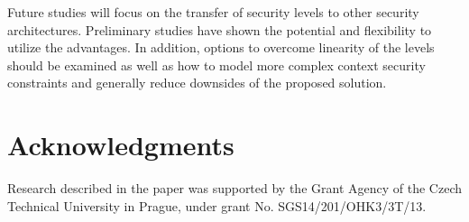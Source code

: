 \documentclass{sig-alternate}
\begin{document}
Future studies will focus on the transfer of security levels to other security architectures. Preliminary studies have shown the potential and flexibility to utilize the advantages. In addition, options to overcome linearity of the levels should be examined as well as how to model more complex context security constraints and generally reduce downsides of the proposed solution.

\section{Acknowledgments}
Research described in the paper was supported by the Grant Agency of the Czech Technical University in Prague, under grant No. SGS14/201/OHK3/3T/13.

%

%
%
\end{document}

